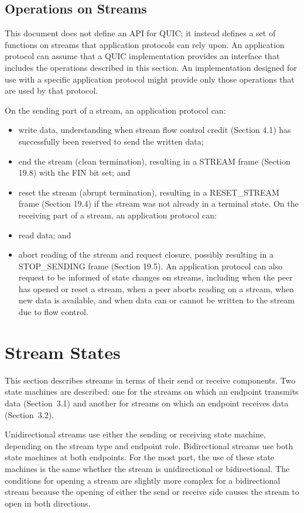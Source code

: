 \documentclass{article}
\begin{document}
\subsection{Operations on Streams}

This document does not define an API for QUIC; it instead defines a set of functions on streams that application protocols can rely upon. An application protocol can assume that a QUIC implementation provides an interface that includes the operations described in this section.  An implementation designed for use with a specific application protocol might provide only those operations that are used by that protocol.

On the sending part of a stream, an application protocol can:

\begin{itemize}
\item write data, understanding when stream flow control credit (Section 4.1) has successfully been reserved to send the written data;
\item end the stream (clean termination), resulting in a STREAM frame (Section 19.8) with the FIN bit set; and
\item reset the stream (abrupt termination), resulting in a RESET\_STREAM frame (Section 19.4) if the stream was not already in a terminal state.
On the receiving part of a stream, an application protocol can:

\item read data; and
\item abort reading of the stream and request closure, possibly resulting in a STOP\_SENDING frame (Section 19.5).
An application protocol can also request to be informed of state changes on streams, including when the peer has opened or reset a stream, when a peer aborts reading on a stream, when new data is available, and when data can or cannot be written to the stream due to flow control.

\end{itemize}
\section{Stream States}

This section describes streams in terms of their send or receive components.  Two state machines are described: one for the streams on which an endpoint transmits data (Section~3.1) and another for streams on which an endpoint receives data (Section~3.2).

Unidirectional streams use either the sending or receiving state machine, depending on the stream type and endpoint role. Bidirectional streams use both state machines at both endpoints.  For the most part, the use of these state machines is the same whether the stream is unidirectional or bidirectional.  The conditions for opening a stream are slightly more complex for a bidirectional stream because the opening of either the send or receive side causes the stream to open in both directions.
\end{document}
